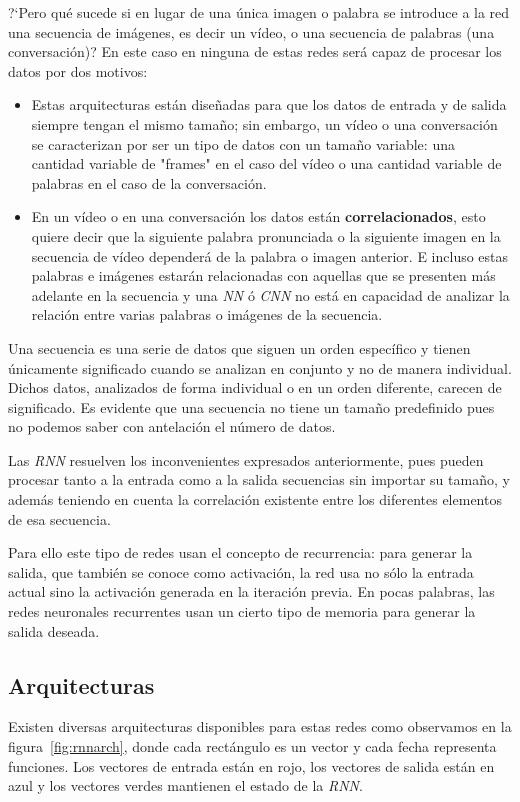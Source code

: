 \documentclass[a4paper,12pt]{article}
\begin{document}
?`Pero qué sucede si en lugar de una única imagen o palabra se introduce a la red una secuencia de imágenes, es decir un vídeo, o una secuencia de palabras (una conversación)? En este caso en ninguna de estas redes será capaz de procesar los datos por dos motivos:
\begin{itemize}[noitemsep, topsep=2pt]
	\item Estas arquitecturas están diseñadas para que los datos de entrada y de salida siempre tengan el mismo tamaño; sin embargo, un vídeo o una conversación se caracterizan por ser un tipo de datos con un tamaño variable: una cantidad variable de "frames"
	      en el caso del vídeo o una cantidad variable de palabras en el caso de la conversación. 
	\item En un vídeo o en una conversación los datos están \textbf{correlacionados}, esto quiere decir que la siguiente palabra pronunciada o la siguiente imagen en la secuencia de vídeo dependerá de la palabra o imagen anterior. E incluso estas palabras e imágenes estarán relacionadas con aquellas que se presenten más adelante en la secuencia y una \textit{NN} ó \textit{CNN} no está en capacidad de analizar la relación entre varias palabras o imágenes de la secuencia.
\end{itemize}

Una secuencia es una serie de datos que siguen un orden específico y tienen únicamente significado cuando se analizan en conjunto y no de manera individual. Dichos datos, analizados de forma individual o en un orden diferente, carecen de significado. Es evidente que una secuencia no tiene un tamaño predefinido pues no podemos saber con antelación el número de datos. 

\clearpage

Las \textit{RNN} resuelven los inconvenientes expresados anteriormente, pues pueden procesar tanto a la entrada como a la salida secuencias sin importar su tamaño, y además teniendo en cuenta la correlación existente entre los diferentes elementos de esa secuencia.

Para ello este tipo de redes usan el concepto de recurrencia: para generar la salida, que también se conoce como activación, la red usa no sólo la entrada actual sino la activación generada en la iteración previa. En pocas palabras, las redes neuronales recurrentes usan un cierto tipo de memoria para generar la salida deseada. 

\subsection{Arquitecturas} \label{rnnarchitecture}
Existen diversas arquitecturas disponibles para estas redes como observamos en la figura~\ref{fig:rnnarch}, donde cada rectángulo es un vector y cada fecha representa funciones. Los vectores de entrada están en rojo, los vectores de salida están en azul y los vectores verdes mantienen el estado de la \textit{RNN}.
\end{document}
